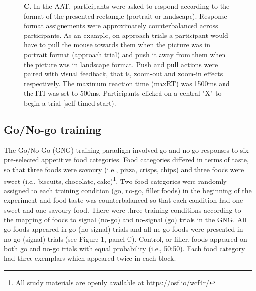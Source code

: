 \documentclass[man,floatsintext]{apa6}
\let\rmarkdownfootnote\footnote%
\def\footnote{\protect\rmarkdownfootnote}
\begin{document}
\begin{figure}
    \ContinuedFloat
    \captionsetup{labelformat=empty}
    \caption{\textbf{C.} In the AAT, participants were asked to respond according to the format of the presented rectangle (portrait or landscape). Response-format assignements were approximately counterbalanced across participants. As an example, on approach trials a participant would have to pull the mouse towards them when the picture was in portrait format (approach trial) and push it away from them when the picture was in landscape format. Push and pull actions were paired with visual feedback, that is, zoom-out and zoom-in effects respectively. The maximum reaction time (maxRT) was 1500ms and the ITI was set to 500ms. Participants clicked on a central "X" to begin a trial (self-timed start).}
\end{figure}

\subsection{Go/No-go training}\label{gng}

\par

The Go/No-Go (GNG) training paradigm involved go and no-go responses to
six pre-selected appetitive food categories. Food categories differed in
terms of taste, so that three foods were savoury (i.e., pizza, crisps,
chips) and three foods were sweet (i.e., biscuits, chocolate,
cake)\footnote{All study materials are openly available at https://osf.io/wcf4r/}.
Two food categories were randomly assigned to each training condition
(go, no-go, filler foods) in the beginning of the experiment and food
taste was counterbalanced so that each condition had one sweet and one
savoury food. There were three training conditions according to the
mapping of foods to signal (no-go) and no-signal (go) trials in the GNG.
All go foods appeared in go (no-signal) trials and all no-go foods were
presented in no-go (signal) trials (see Figure 1, panel C). Control, or
filler, foods appeared on both go and no-go trials with equal
probability (i.e., 50:50). Each food category had three exemplars which
appeared twice in each block.

\par
\end{document}

